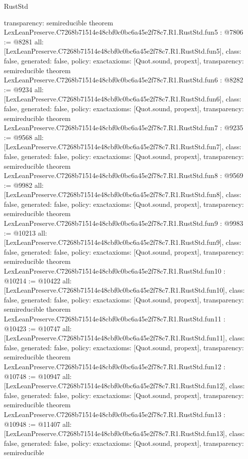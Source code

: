 \begin{lexlean}{RustStd}
\begin{coremodule}
{  transparency: semireducible
}
theorem LexLeanPreserve.C7268b71514e48cbf0c0bc6a45e2f78c7.R1.RustStd.fun5 : @7806 := @8281 {
  all: [LexLeanPreserve.C7268b71514e48cbf0c0bc6a45e2f78c7.R1.RustStd.fun5],
  class: false,
  generated: false,
  policy: exact{axioms: [Quot.sound, propext]},
  transparency: semireducible
}
theorem LexLeanPreserve.C7268b71514e48cbf0c0bc6a45e2f78c7.R1.RustStd.fun6 : @8282 := @9234 {
  all: [LexLeanPreserve.C7268b71514e48cbf0c0bc6a45e2f78c7.R1.RustStd.fun6],
  class: false,
  generated: false,
  policy: exact{axioms: [Quot.sound, propext]},
  transparency: semireducible
}
theorem LexLeanPreserve.C7268b71514e48cbf0c0bc6a45e2f78c7.R1.RustStd.fun7 : @9235 := @9568 {
  all: [LexLeanPreserve.C7268b71514e48cbf0c0bc6a45e2f78c7.R1.RustStd.fun7],
  class: false,
  generated: false,
  policy: exact{axioms: [Quot.sound, propext]},
  transparency: semireducible
}
theorem LexLeanPreserve.C7268b71514e48cbf0c0bc6a45e2f78c7.R1.RustStd.fun8 : @9569 := @9982 {
  all: [LexLeanPreserve.C7268b71514e48cbf0c0bc6a45e2f78c7.R1.RustStd.fun8],
  class: false,
  generated: false,
  policy: exact{axioms: [Quot.sound, propext]},
  transparency: semireducible
}
theorem LexLeanPreserve.C7268b71514e48cbf0c0bc6a45e2f78c7.R1.RustStd.fun9 : @9983 := @10213 {
  all: [LexLeanPreserve.C7268b71514e48cbf0c0bc6a45e2f78c7.R1.RustStd.fun9],
  class: false,
  generated: false,
  policy: exact{axioms: [Quot.sound, propext]},
  transparency: semireducible
}
theorem LexLeanPreserve.C7268b71514e48cbf0c0bc6a45e2f78c7.R1.RustStd.fun10 : @10214 := @10422 {
  all: [LexLeanPreserve.C7268b71514e48cbf0c0bc6a45e2f78c7.R1.RustStd.fun10],
  class: false,
  generated: false,
  policy: exact{axioms: [Quot.sound, propext]},
  transparency: semireducible
}
theorem LexLeanPreserve.C7268b71514e48cbf0c0bc6a45e2f78c7.R1.RustStd.fun11 : @10423 := @10747 {
  all: [LexLeanPreserve.C7268b71514e48cbf0c0bc6a45e2f78c7.R1.RustStd.fun11],
  class: false,
  generated: false,
  policy: exact{axioms: [Quot.sound, propext]},
  transparency: semireducible
}
theorem LexLeanPreserve.C7268b71514e48cbf0c0bc6a45e2f78c7.R1.RustStd.fun12 : @10748 := @10947 {
  all: [LexLeanPreserve.C7268b71514e48cbf0c0bc6a45e2f78c7.R1.RustStd.fun12],
  class: false,
  generated: false,
  policy: exact{axioms: [Quot.sound, propext]},
  transparency: semireducible
}
theorem LexLeanPreserve.C7268b71514e48cbf0c0bc6a45e2f78c7.R1.RustStd.fun13 : @10948 := @11407 {
  all: [LexLeanPreserve.C7268b71514e48cbf0c0bc6a45e2f78c7.R1.RustStd.fun13],
  class: false,
  generated: false,
  policy: exact{axioms: [Quot.sound, propext]},
  transparency: semireducible
}
\end{coremodule}
\end{lexlean}
